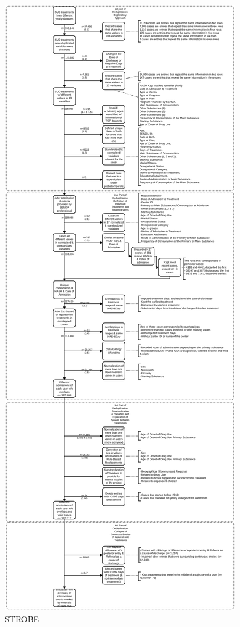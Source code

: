 \documentclass[
]{article}
\begin{document}
\begin{figure}
\centering
\includegraphics{Figures/Diagram_STROBE.svg}
\caption{STROBE}
\end{figure}
\end{document}
